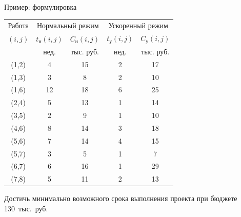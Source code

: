\documentclass[unicode,11pt,notheorems]{beamer}
\begin{document}
\begin{frame}{Пример: формулировка}{}
 	{\centering
	\begin{tabular}{|c|c|c|c|c|}
		\hline
		Работа & \multicolumn{2}{c|}{Нормальный режим} & \multicolumn{2}{c|}{Ускоренный режим}\\
		$(i,j)$ & $t_\text{н}(i,j)$ & $C_\text{н}(i,j)$ & $t_\text{у}(i,j)$ & $C_\text{у}(i,j)$  \\
		 & нед. & тыс. руб. & нед. & тыс. руб.  \\
		\hline
		(1,2) & 4  & 15 & 2 & 17 \\
		(1,3) & 3  & 8  & 2 & 10 \\
		(1,6) & 12 & 18 & 6 & 25 \\
		(2,4) & 5  & 13 & 1 & 14 \\
		(3,5) & 2  & 9  & 1 & 10 \\
		(4,6) & 8  & 14 & 3 & 18 \\
		(5,6) & 7  & 14 & 4 & 15 \\
		(5,7) & 3  & 5  & 1 & 7  \\
		(6,7) & 6  & 16 & 1 & 29 \\
		(7,8) & 5  & 11 & 2 & 13 \\
		\hline
	\end{tabular}\par}

\bigskip
{} Достичь минимально возможного срока выполнения проекта при бюджете 130~тыс.~руб. 
\end{frame}
\end{document}
